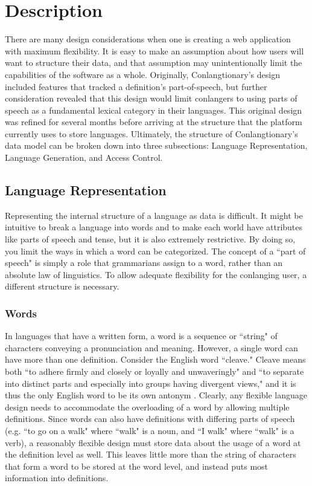 \chapter{Description}
\label{chap:description}
There are many design considerations when one is creating a web application with maximum flexibility. It is easy to make an assumption about how users will want to structure their data, and that assumption may unintentionally limit the capabilities of the software as a whole. Originally, Conlangtionary's design included features that tracked a definition's part-of-speech, but further consideration revealed that this design would limit conlangers to using parts of speech as a fundamental lexical category in their languages. This original design was refined for several months before arriving at the structure that the platform currently uses to store languages. Ultimately, the structure of Conlangtionary's data model can be broken down into three subsections: Language Representation, Language Generation, and Access Control.

\section{Language Representation}
\label{sec:language-representation}

Representing the internal structure of a language as data is difficult. It might be intuitive to break a language into words and to make each world have attributes like parts of speech and tense, but it is also extremely restrictive. By doing so, you limit the ways in which a word can be categorized. The concept of a ``part of speech" is simply a role that grammarians assign to a word, rather than an absolute law of linguistics. To allow adequate flexibility for the conlanging user, a different structure is necessary.

\subsection{Words}
\label{subsec:words}
In languages that have a written form, a word is a sequence or ``string" of characters conveying a pronunciation and meaning. However, a single word can have more than one definition. Consider the English word ``cleave." Cleave means both ``to adhere firmly and closely or loyally and unwaveringly" and ``to separate into distinct parts and especially into groups having divergent views," and it is thus the only English word to be its own antonym \cite{Merriam-Webster:cleave}. Clearly, any flexible language design needs to accommodate the overloading of a word by allowing multiple definitions. Since words can also have definitions with differing parts of speech (e.g. ``to go on a walk" where ``walk" is a noun, and ``I walk" where ``walk" is a verb), a reasonably flexible design must store data about the usage of a word at the definition level as well. This leaves little more than the string of characters that form a word to be stored at the word level, and instead puts most information into definitions.

